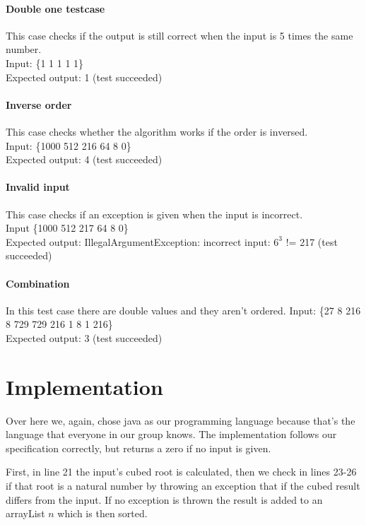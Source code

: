 \documentclass[12pt]{article}
\begin{document}
\paragraph{Double one testcase}
This case checks if the output is still correct when the input is 5 times the same number. \\
Input: \{1 1 1 1 1\} \\
Expected output: 1 (test succeeded)

\paragraph{Inverse order}
This case checks whether the algorithm works if the order is inversed. \\
Input: \{1000 512 216 64 8 0\} \\
Expected output: 4 (test succeeded)

\paragraph{Invalid input}
This case checks if an exception is given when the input is incorrect. \\
Input \{1000 512 217 64 8 0\} \\
Expected output: IllegalArgumentException: incorrect input: $6^3$ != 217 (test succeeded)

\paragraph{Combination}
In this test case there are double values and they aren't ordered.
Input: \{27 8 216 8 729 729 216 1 8 1 216\} \\
Expected output: 3 (test succeeded)

\section{Implementation}
Over here we, again, chose java as our programming language because that's the language that everyone in our group knows. The implementation follows our specification correctly, but returns a zero if no input is given.

First, in line 21 the input's cubed root is calculated, then we check in lines 23-26 if that root is a natural number by throwing an exception that if the cubed result differs from the input. If no exception is thrown the result is added to an arrayList $n$ which is then sorted.
\end{document}
